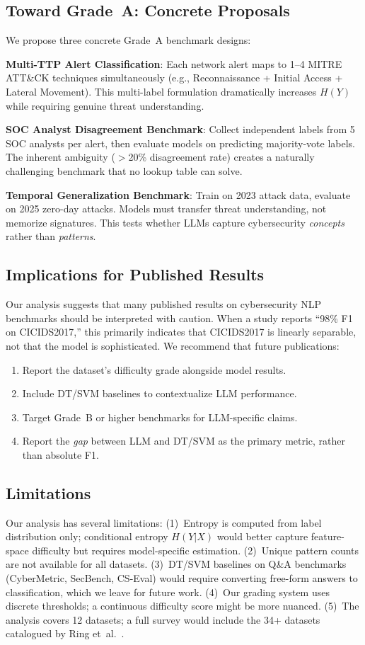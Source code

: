 \documentclass[journal]{IEEEtran}
\begin{document}
\subsection{Toward Grade~A: Concrete Proposals}
We propose three concrete Grade~A benchmark designs:

\textbf{Multi-TTP Alert Classification}: Each network alert maps to 1--4 MITRE ATT\&CK techniques simultaneously (e.g., Reconnaissance + Initial Access + Lateral Movement). This multi-label formulation dramatically increases $H(Y)$ while requiring genuine threat understanding.

\textbf{SOC Analyst Disagreement Benchmark}: Collect independent labels from 5 SOC analysts per alert, then evaluate models on predicting majority-vote labels. The inherent ambiguity ($>$20\% disagreement rate) creates a naturally challenging benchmark that no lookup table can solve.

\textbf{Temporal Generalization Benchmark}: Train on 2023 attack data, evaluate on 2025 zero-day attacks. Models must transfer threat understanding, not memorize signatures. This tests whether LLMs capture cybersecurity \emph{concepts} rather than \emph{patterns}.

\subsection{Implications for Published Results}
Our analysis suggests that many published results on cybersecurity NLP benchmarks should be interpreted with caution. When a study reports ``98\% F1 on CICIDS2017,'' this primarily indicates that CICIDS2017 is linearly separable, not that the model is sophisticated. We recommend that future publications:

\begin{enumerate}
\item Report the dataset's difficulty grade alongside model results.
\item Include DT/SVM baselines to contextualize LLM performance.
\item Target Grade~B or higher benchmarks for LLM-specific claims.
\item Report the \emph{gap} between LLM and DT/SVM as the primary metric, rather than absolute F1.
\end{enumerate}

\subsection{Limitations}
Our analysis has several limitations: (1)~Entropy is computed from label distribution only; conditional entropy $H(Y|X)$ would better capture feature-space difficulty but requires model-specific estimation. (2)~Unique pattern counts are not available for all datasets. (3)~DT/SVM baselines on Q\&A benchmarks (CyberMetric, SecBench, CS-Eval) would require converting free-form answers to classification, which we leave for future work. (4)~Our grading system uses discrete thresholds; a continuous difficulty score might be more nuanced. (5)~The analysis covers 12 datasets; a full survey would include the 34+ datasets catalogued by Ring et~al.~\cite{ring2019}.
\end{document}
